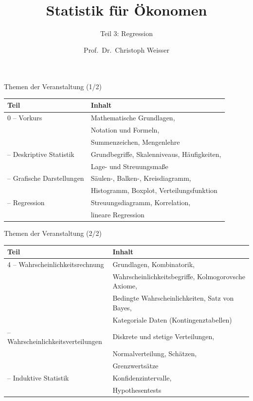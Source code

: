 \documentclass[aspectratio=169,11pt]{beamer}
\title{Statistik für Ökonomen}
\subtitle{Teil 3: Regression}
\author{Prof.\ Dr.\ Christoph Weisser}
\institute{HSBI}
\date{}
\begin{document}
\frame{\titlepage}

\begin{frame}[t]{Themen der Veranstaltung (1/2)}
  \renewcommand{\arraystretch}{1.1}
  \begin{tabular}{@{}l l@{}}
    \toprule
    \textbf{Teil} & \textbf{Inhalt} \\
    \midrule
    0 -- Vorkurs & Mathematische Grundlagen, \\
      & Notation und Formeln, \\
      & Summenzeichen, Mengenlehre \\
    \addlinespace
    1 -- Deskriptive Statistik & Grundbegriffe, Skalenniveaus, Häufigkeiten, \\
      & Lage- und Streuungsmaße \\
    \addlinespace
    2 -- Grafische Darstellungen & Säulen-, Balken-, Kreisdiagramm, \\
      & Histogramm, Boxplot, Verteilungsfunktion \\
    \addlinespace
    3 -- Regression & Streuungsdiagramm, Korrelation, \\
      & lineare Regression \\
    \bottomrule
  \end{tabular}
\end{frame}

\begin{frame}[t]{Themen der Veranstaltung (2/2)}
  \renewcommand{\arraystretch}{1.05}
  \begin{tabular}{@{}l l@{}}
    \toprule
    \textbf{Teil} & \textbf{Inhalt} \\
    \midrule
    4 -- Wahrscheinlichkeitsrechnung & Grundlagen, Kombinatorik, \\
      & Wahrscheinlichkeitsbegriffe, Kolmogorovsche Axiome, \\
      & Bedingte Wahrscheinlichkeiten, Satz von Bayes, \\
      & Kategoriale Daten (Kontingenztabellen) \\
    \addlinespace
    5 -- Wahrscheinlichkeitsverteilungen & Diskrete und stetige Verteilungen, \\
      & Normalverteilung, Schätzen, \\
      & Grenzwertsätze \\
    \addlinespace
    6 -- Induktive Statistik & Konfidenzintervalle, \\
      & Hypothesentests \\
    \bottomrule
  \end{tabular}
\end{frame}
\end{document}
